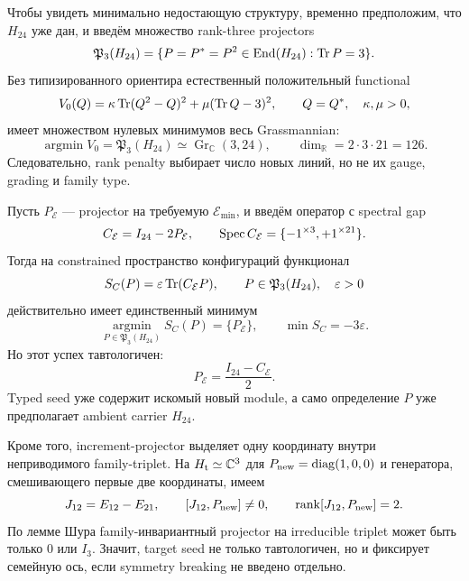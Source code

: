 Чтобы увидеть минимально недостающую структуру, временно предположим, что
$H_{24}$ уже дан, и введём множество rank-three projectors
\begin{equation}
 \mathfrak P_3(H_{24})=
 \{P=P^*=P^2\in\operatorname{End}(H_{24}):\operatorname{Tr} P=3\}.
 \label{eq:v9-endpoint-parent-projector-space}
\end{equation}
Без типизированного ориентира естественный положительный functional
\begin{equation}
 V_0(Q)=\kappa\operatorname{Tr}(Q^2-Q)^2
       +\mu(\operatorname{Tr} Q-3)^2,
 \qquad Q=Q^*,\quad \kappa,\mu>0,
 \label{eq:v9-endpoint-parent-projector-potential}
\end{equation}
имеет множеством нулевых минимумов весь Grassmannian:
\begin{equation}
 \operatorname*{argmin}V_0=\mathfrak P_3(H_{24})
 \simeq \operatorname{Gr}_{\mathbb C}(3,24),
 \qquad \dim_{\mathbb R}=2\cdot3\cdot21=126.
 \label{eq:v9-endpoint-parent-grassmannian-degeneracy}
\end{equation}
Следовательно, rank penalty выбирает число новых линий, но не их gauge,
grading и family type.

Пусть $P_{\mathcal E}$ --- projector на требуемую
$\mathcal E_{\min}$, и введём оператор с spectral gap
\begin{equation}
 C_{\mathcal E}=I_{24}-2P_{\mathcal E},
 \qquad
 \operatorname{Spec} C_{\mathcal E}=\{-1^{\times3},+1^{\times21}\}.
 \label{eq:v9-endpoint-parent-target-seed}
\end{equation}
Тогда на constrained пространство конфигураций функционал
\begin{equation}
 S_C(P)=\varepsilon\operatorname{Tr}(C_{\mathcal E}P),
 \qquad P\in\mathfrak P_3(H_{24}),\quad\varepsilon>0
 \label{eq:v9-endpoint-parent-seeded-score}
\end{equation}
действительно имеет единственный минимум
\begin{equation}
 \operatorname*{argmin}_{P\in\mathfrak P_3(H_{24})}S_C(P)
 =\{P_{\mathcal E}\},
 \qquad \min S_C=-3\varepsilon.
 \label{eq:v9-endpoint-parent-seeded-minimum}
\end{equation}
Но этот успех тавтологичен:
\begin{equation}
 P_{\mathcal E}=\frac{I_{24}-C_{\mathcal E}}2.
 \label{eq:v9-endpoint-parent-seed-circularity}
\end{equation}
Typed seed уже содержит искомый новый module, а само определение $P$ уже
предполагает ambient carrier $H_{24}$.

Кроме того, increment-projector выделяет одну координату внутри
неприводимого family-triplet. На $H_{\rm t}\simeq\mathbb C^3$ для
$P_{\rm new}=\operatorname{diag}(1,0,0)$ и генератора, смешивающего первые
две координаты, имеем
\begin{equation}
 J_{12}=E_{12}-E_{21},
 \qquad [J_{12},P_{\rm new}]\ne0,
 \qquad \operatorname{rank}[J_{12},P_{\rm new}]=2.
 \label{eq:v9-endpoint-parent-family-projector-obstruction}
\end{equation}
По лемме Шура family-инвариантный projector на irreducible triplet может
быть только $0$ или $I_3$. Значит, target seed не только тавтологичен, но и
фиксирует семейную ось, если symmetry breaking не введено отдельно.

